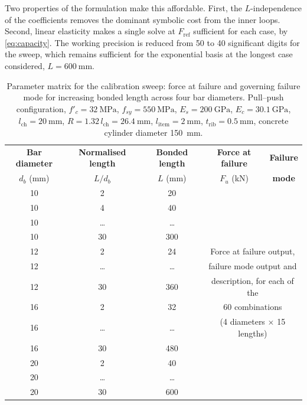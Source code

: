 Two properties of the formulation make this affordable. First, the
$L$-independence of the coefficients removes the dominant symbolic cost from
the inner loops. Second, linear elasticity makes a single solve at
$F_{\mathrm{ref}}$ sufficient for each case, by \eqref{eq:capacity}. The
working precision is reduced from 50 to 40 significant digits for the sweep,
which remains sufficient for the exponential basis at the longest case
considered, $L = \SI{600}{\milli\metre}$.
 
\begin{table}[htbp]
\centering
\caption[Parameter matrix for the calibration sweep]{Parameter matrix for the calibration sweep: force at failure and
         governing failure mode for increasing bonded length across four bar
         diameters. Pull--push configuration,
         $f'_c = \SI{32}{\mega\pascal}$, $f_{sy} = \SI{550}{\mega\pascal}$,
         $E_s = \SI{200}{\giga\pascal}$, $E_c = \SI{30.1}{\giga\pascal}$,
         $l_{\mathrm{ch}} = \SI{20}{\milli\metre}$,
         $R = 1.32\,l_{\mathrm{ch}} = \SI{26.4}{\milli\metre}$,
         $l_{\mathrm{item}} = \SI{2}{\milli\metre}$,
         $t_{\mathrm{rib}} = \SI{0.5}{\milli\metre}$, concrete cylinder
         diameter \SI{150}{\milli\metre}.}
\label{tab:param-matrix}
\begin{tabular}{|c|c|c|c|c|}
\hline
\textbf{Bar diameter} & \textbf{Normalised length} & \textbf{Bonded length}
  & \textbf{Force at failure} & \textbf{Failure} \\
$d_b$ (mm) & $L/d_b$ & $L$ (mm) & $F_u$ (kN) & \textbf{mode} \\
\hline
10 & 2     & 20    & \multicolumn{2}{c|}{} \\
10 & 4     & 40    & \multicolumn{2}{c|}{} \\
10 & \dots & \dots & \multicolumn{2}{c|}{} \\
10 & 30    & 300   & \multicolumn{2}{c|}{} \\
12 & 2     & 24    & \multicolumn{2}{c|}{Force at failure output,} \\
12 & \dots & \dots & \multicolumn{2}{c|}{failure mode output and} \\
12 & 30    & 360   & \multicolumn{2}{c|}{description, for each of the} \\
16 & 2     & 32    & \multicolumn{2}{c|}{60 combinations} \\
16 & \dots & \dots & \multicolumn{2}{c|}{(4 diameters $\times$ 15 lengths)} \\
16 & 30    & 480   & \multicolumn{2}{c|}{} \\
20 & 2     & 40    & \multicolumn{2}{c|}{} \\
20 & \dots & \dots & \multicolumn{2}{c|}{} \\
20 & 30    & 600   & \multicolumn{2}{c|}{} \\
\hline
\end{tabular}
\end{table}
 
